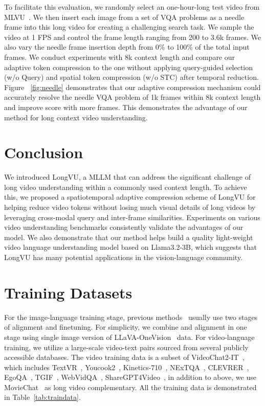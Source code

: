 To facilitate this evaluation, we randomly select an one-hour-long test video from MLVU~\citep{zhou2024mlvu}. We then insert each image from a set of VQA problems as a needle frame into this long video for creating a challenging search task. We sample the video at 1 FPS and control the frame length ranging from 200 to 3.6k frames. We also vary the needle frame insertion depth from 0\% to 100\% of the total input frames. We conduct experiments with 8k context length and compare our adaptive token compression to the one without applying query-guided selection (w/o Query) and spatial token compression (w/o STC) after temporal reduction. Figure ~\ref{fig:needle} demonstrates that our adaptive compression mechanism could accurately resolve the needle VQA problem of 1k frames within 8k context length and improve score with more frames. This demonstrates the advantage of our method for long context video understanding. 

\section{Conclusion}

We introduced LongVU, a MLLM that can address the significant challenge of long video understanding within a commonly used context length. To achieve this, we proposed a spatiotemporal adaptive compression scheme of LongVU for helping reduce video tokens without losing much visual details of long videos by leveraging cross-modal query and inter-frame similarities. Experiments on various video understanding benchmarks consistently validate the advantages of our model. We also demonstrate that our method helps build a quality light-weight video language understanding model based on Llama3.2-3B, which suggests that LongVU has many potential applications in the vision-language community. 

\clearpage
\newpage
\beginappendix

\section{Training Datasets}

For the image-language training stage, previous methods~\citep{chen2023shikra,peng2023kosmos,wang2023cogvlm,chen2023minigpt,liu2024llavanext,dong2024internlm} usually use two stages of alignment and finetuning. For simplicity, we combine and alignment in one stage using single image version of LLaVA-OneVision~\citep{li2024llava} data. For video-language training, we utilize a large-scale video-text pairs sourced from several publicly accessible databases. The video training data is a subset of VideoChat2-IT~\citep{li2024mvbench}, which includes TextVR~\citep{wu2025large}, Youcook2~\citep{zhou2018towards}, Kinetics-710~\citep{kay2017kinetics}, NExTQA~\citep{xiao2021next}, CLEVRER~\citep{yi2019clevrer}, EgoQA~\citep{fan2019egovqa}, TGIF~\citep{li2016tgif}, WebVidQA~\citep{yang2021just}, ShareGPT4Video~\citep{chen2024sharegpt4video}, in addition to above, we use MovieChat~\citep{song2024moviechat} as long video complementary. All the training data is demonstrated in Table~\ref{tab:traindata}.

